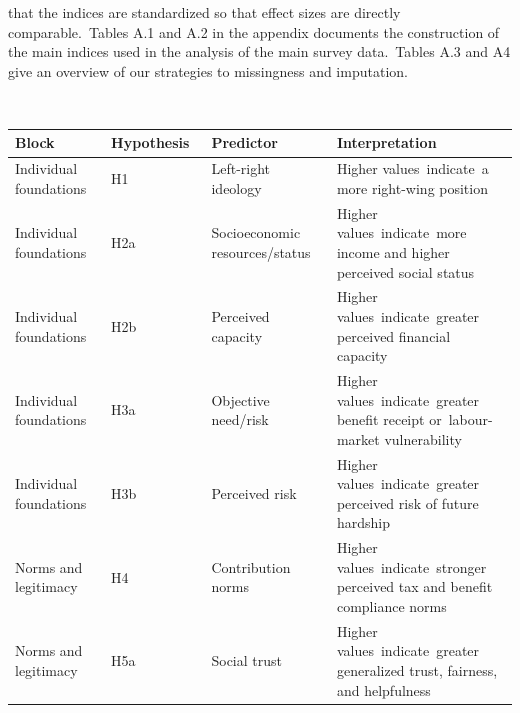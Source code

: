 \documentclass[12pt]{article}
\begin{document}
that the indices are standardized so that effect sizes are directly
comparable.~Tables A.1 and A.2 in the appendix documents the
construction of the main indices used in the analysis of the main survey
data.~Tables A.3 and A4 give an overview of our strategies to
missingness and imputation.

~

\begin{longtable}[]{@{}
  >{\raggedright\arraybackslash}p{}
  >{\raggedright\arraybackslash}p{}
  >{\raggedright\arraybackslash}p{}
  >{\raggedright\arraybackslash}p{}@{}}
\toprule\noalign{}
\begin{minipage}[b]{\linewidth}\raggedright
\textbf{Block}~
\end{minipage} & \begin{minipage}[b]{\linewidth}\raggedright
\textbf{Hypothesis}~
\end{minipage} & \begin{minipage}[b]{\linewidth}\raggedright
\textbf{Predictor}~
\end{minipage} & \begin{minipage}[b]{\linewidth}\raggedright
\textbf{Interpretation}~
\end{minipage} \\
\midrule\noalign{}
\endhead
\bottomrule\noalign{}
\endlastfoot
Individual foundations~ & H1~ & Left-right ideology~ & Higher
values~indicate~a more right-wing position~ \\
Individual foundations~ & H2a~ & Socioeconomic resources/status~ &
Higher values~indicate~more income and higher perceived social
status~ \\
Individual foundations~ & H2b~ & Perceived capacity~ & Higher
values~indicate~greater perceived financial capacity~ \\
Individual foundations~ & H3a~ & Objective need/risk~ & Higher
values~indicate~greater benefit receipt or~labour-market
vulnerability~ \\
Individual foundations~ & H3b~ & Perceived risk~ & Higher
values~indicate~greater perceived risk of future hardship~ \\
Norms and legitimacy~ & H4~ & Contribution norms~ & Higher
values~indicate~stronger perceived tax and benefit compliance norms~ \\
Norms and legitimacy~ & H5a~ & Social trust~ & Higher
values~indicate~greater generalized trust, fairness, and helpfulness~ \\

\end{longtable}
\end{document}
